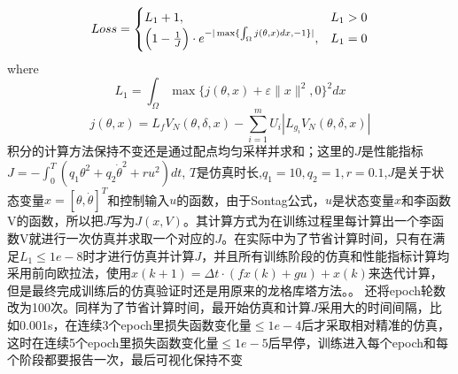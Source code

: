 \documentclass[a4paper,zihao=-4]{article}
\numberwithin{equation}{section}
\numberwithin{figure}{section}
\numberwithin{table}{section}
\begin{document}
\begin{equation}
	Loss = 
	\begin{cases}
		L_1 + 1, & L_1 > 0 \\
		\Bigl(1 - \frac{1}{J}\Bigr) \cdot e^{-| \max\{\int_{\Omega} j(\theta, x) dx, -1 \} | }, & L_1 = 0
	\end{cases}
\end{equation}
where \begin{equation}
	L_1 = \int_{\Omega} \max \{j(\theta, x) + \varepsilon \|x\|^{2}, 0\}^{2} dx
\end{equation}
\begin{equation}
	j(\theta, x) = L_{f} V_{N}(\theta, \delta, x) - \sum_{i=1}^{m} U_i \left| L_{g_i} V_{N}(\theta, \delta, x) \right|
\end{equation}
积分的计算方法保持不变还是通过配点均匀采样并求和；这里的$J$是性能指标
$J = -\int_{0}^{T} \left( q_1 \theta^2 + q_2 \dot{\theta}^2 + r u^2\right)dt$,
$T$是仿真时长,$q_1=10,q_2=1,r=0.1$,$J$是关于状态变量$x=[\theta,\dot\theta]^T$和控制输入$u$的函数，由于Sontag公式，$u$是状态变量$x$和李函数V的函数，所以把$J$写为$J(x,V)$。其计算方式为在训练过程里每计算出一个李函数V就进行一次仿真并求取一个对应的$J$。在实际中为了节省计算时间，只有在满足$L_1 \leq 1e-8$时才进行仿真并计算$J$，并且所有训练阶段的仿真和性能指标计算均采用前向欧拉法，使用$x(k+1)=\Delta t \cdot (fx(k)+gu)+x(k)$来迭代计算，但是最终完成训练后的仿真验证时还是用原来的龙格库塔方法。。
还将epoch轮数改为100次。同样为了节省计算时间，最开始仿真和计算$J$采用大的时间间隔，比如0.001s，在连续3个epoch里损失函数变化量$\leq 1e-4$后才采取相对精准的仿真，这时在连续5个epoch里损失函数变化量$\leq 1e-5$后早停，训练进入每个epoch和每个阶段都要报告一次，最后可视化保持不变
\end{document}
